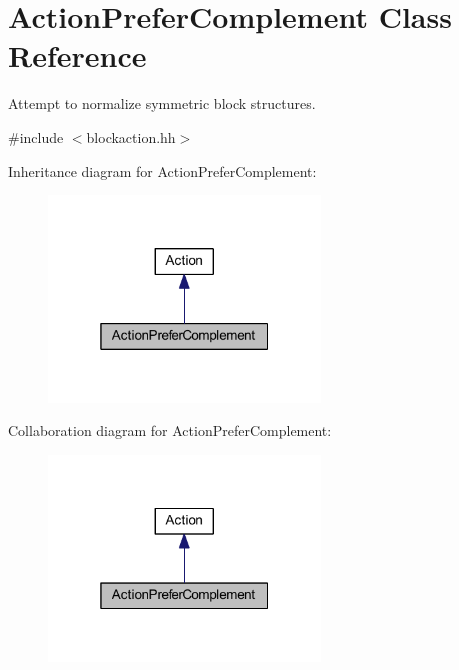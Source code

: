 \hypertarget{class_action_prefer_complement}{}\section{Action\+Prefer\+Complement Class Reference}
\label{class_action_prefer_complement}


Attempt to normalize symmetric block structures.  




{\ttfamily \#include $<$blockaction.\+hh$>$}



Inheritance diagram for Action\+Prefer\+Complement\+:
\nopagebreak
\begin{figure}[H]
\begin{center}
\leavevmode
\includegraphics[width=205pt]{class_action_prefer_complement__inherit__graph}
\end{center}
\end{figure}


Collaboration diagram for Action\+Prefer\+Complement\+:
\nopagebreak
\begin{figure}[H]
\begin{center}
\leavevmode
\includegraphics[width=205pt]{class_action_prefer_complement__coll__graph}
\end{center}
\end{figure}
